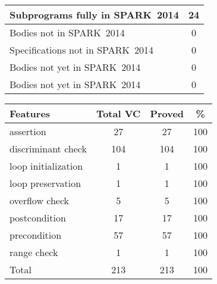 \documentclass[10pt,a4paper,twocolumn]{article}
\newcommand{\newspark}{SPARK~2014\xspace}
\begin{document}
\vspace{5mm}

\begin{tabular}{|l|c|}
\hline
Subprograms fully in \newspark  & 24 \\
\hline
Bodies not in \newspark         & 0  \\
\hline
Specifications not in \newspark & 0  \\
\hline
Bodies not yet in \newspark     & 0  \\
\hline
Bodies not yet in \newspark     & 0  \\
\hline
\end{tabular}

\vspace{5mm}

\begin{tabular}{|l|c|c|c|}
\hline
Features             & Total VC & Proved & \%  \\ %
\hline
assertion            & 27       & 27     & 100 \\ %
\hline
discriminant check   & 104      & 104    & 100 \\ %
\hline
loop  initialization & 1        & 1      & 100 \\ %
\hline
loop  preservation   & 1        & 1      & 100 \\ %
\hline
overflow check       & 5        & 5      & 100 \\ %
\hline
postcondition        & 17       & 17     & 100 \\ %
\hline
precondition         & 57       & 57     & 100 \\ %
\hline
range check          & 1        & 1      & 100 \\ %
\hline
Total                & 213      & 213    & 100 \\ %
\hline
\end{tabular}
\end{document}

